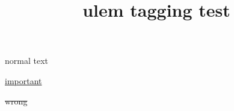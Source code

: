 \documentclass{article}
\title{ulem tagging test}
\begin{document}
normal text

\uline{important}



\sout{wrong}



\end{document}
